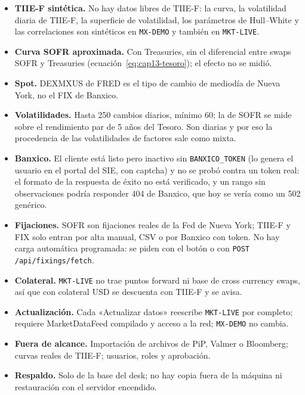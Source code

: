 \begin{sloppypar}
\begin{limites}
  \begin{itemize}
    \item \textbf{TIIE-F sintética.} No hay datos libres de TIIE-F: la curva, la volatilidad diaria de TIIE-F, la superficie de volatilidad, los parámetros de Hull--White y las correlaciones son sintéticos en \texttt{MX-DEMO} y también en \texttt{MKT-LIVE}.
    \item \textbf{Curva SOFR aproximada.} Con Treasuries, sin el diferencial entre swaps SOFR y Treasuries (ecuación~\eqref{eq:cap13-tesoro}); el efecto no se midió.
    \item \textbf{Spot.} DEXMXUS de FRED es el tipo de cambio de mediodía de Nueva York, no el FIX de Banxico.
    \item \textbf{Volatilidades.} Hasta 250 cambios diarios, mínimo 60; la de SOFR se mide sobre el rendimiento par de 5 años del Tesoro. Son diarias y por eso la procedencia de las volatilidades de factores sale como mixta.
    \item \textbf{Banxico.} El cliente está listo pero inactivo sin \texttt{BANXICO\_TOKEN} (lo genera el usuario en el portal del SIE, con captcha) y no se probó contra un token real: el formato de la respuesta de éxito no está verificado, y un rango sin observaciones podría responder 404 de Banxico, que hoy se vería como un 502 genérico.
    \item \textbf{Fijaciones.} SOFR son fijaciones reales de la Fed de Nueva York; TIIE-F y FIX solo entran por alta manual, CSV o por Banxico con token. No hay carga automática programada: se piden con el botón o con \texttt{POST /api/fixings/fetch}.
    \item \textbf{Colateral.} \texttt{MKT-LIVE} no trae puntos forward ni base de cross currency swaps, así que con colateral USD se descuenta con TIIE-F y se avisa.
    \item \textbf{Actualización.} Cada «Actualizar datos» reescribe \texttt{MKT-LIVE} por completo; requiere MarketDataFeed compilado y acceso a la red; \texttt{MX-DEMO} no cambia.
    \item \textbf{Fuera de alcance.} Importación de archivos de PiP, Valmer o Bloomberg; curvas reales de TIIE-F; usuarios, roles y aprobación.
    \item \textbf{Respaldo.} Solo de la base del desk; no hay copia fuera de la máquina ni restauración con el servidor encendido.
  \end{itemize}
\end{limites}


\end{sloppypar}
